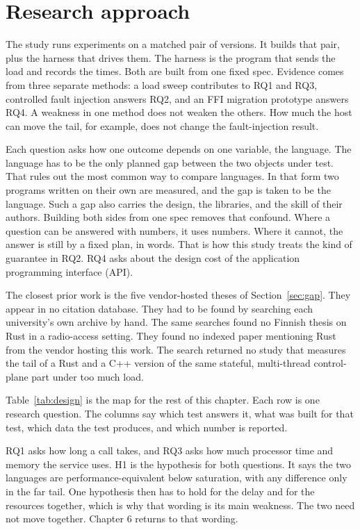 \documentclass[english,oneside,a4paper,censored,csm,software-track-2020]{HYthesisML}
\begin{document}
\FloatBarrier
      
\section{Research approach}\label{sec:approach}
The study runs experiments on a matched pair of versions. It builds that
pair, plus the harness that drives them. The harness is the program that sends
the load and records the times. Both are built from one
fixed spec. Evidence comes from three separate methods: a load sweep contributes to
RQ1 and RQ3, controlled fault injection answers RQ2, and an FFI migration
prototype answers RQ4. A weakness in one method does not weaken the others. How much the host can move the
tail, for example, does not change the fault-injection result.

Each question asks how one outcome depends on one variable, the language. The
language has to be the only planned gap between the two objects under test.
That rules out the most common way to compare languages. In that form two
programs written on their own are measured, and the gap is taken to be the
language. Such a gap also carries the design, the libraries, and the skill of
their authors. Building both sides from one spec removes that confound. Where
a question can be answered with numbers, it uses numbers. Where it cannot, the
answer is still by a fixed plan, in words. That is how this study treats the
kind of guarantee in RQ2. RQ4 asks about the design cost of the application
programming interface (API).

The closest prior work is the five vendor-hosted theses of
Section~\ref{sec:gap}. They appear in no citation database. They had to be
found by searching each university's own archive by hand. The same searches
found no Finnish thesis on Rust in a radio-access setting. They found no
indexed paper mentioning Rust from the vendor hosting this work. The search
returned no study that measures the tail of a Rust and a C++ version of the
same stateful, multi-thread control-plane part under too much load.

Table~\ref{tab:design} is the map for the rest of this chapter. Each row is one research question.
The columns say which test answers it, what was built for that test, which data the test
produces, and which number is reported.

RQ1 asks how long a call takes, and RQ3 asks how much processor time and memory
the service uses. H1 is the hypothesis for
both questions. It says the two languages are performance-equivalent below
saturation, with any difference only in the far tail. One hypothesis then has
to hold for the delay and for the resources together, which is why that wording
is its main weakness. The two need not move together. Chapter 6 returns to that wording.
\end{document}
